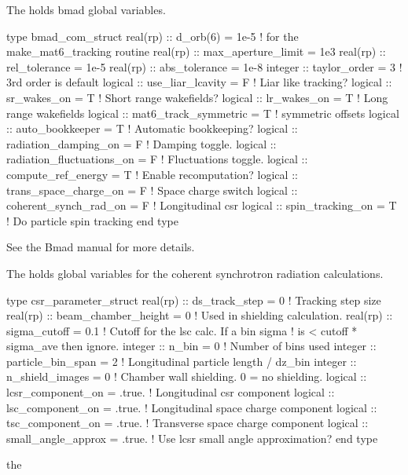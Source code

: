 {{{{{{The  holds bmad global variables. 
\begin{example}
  type bmad_com_struct
    real(rp) :: d_orb(6) = 1e-5  ! for the make_mat6_tracking routine
    real(rp) :: max_aperture_limit = 1e3    
    real(rp) :: rel_tolerance = 1e-5
    real(rp) :: abs_tolerance = 1e-8
    integer :: taylor_order = 3               ! 3rd order is default
    logical :: use_liar_lcavity = F           ! Liar like tracking?
    logical :: sr_wakes_on = T                ! Short range wakefields?
    logical :: lr_wakes_on = T                ! Long range wakefields
    logical :: mat6_track_symmetric = T       ! symmetric offsets
    logical :: auto_bookkeeper = T            ! Automatic bookkeeping?
    logical :: radiation_damping_on = F       ! Damping toggle.
    logical :: radiation_fluctuations_on = F  ! Fluctuations toggle.
    logical :: compute_ref_energy = T         ! Enable recomputation?
    logical :: trans_space_charge_on = F      ! Space charge switch
    logical :: coherent_synch_rad_on = F      ! Longitudinal csr 
    logical :: spin_tracking_on = T           ! Do particle spin tracking
  end type
\end{example}
See the Bmad manual for more details.

The  holds global variables for the coherent
synchrotron radiation calculations. 
\begin{example}
  type csr_parameter_struct
    real(rp) :: ds_track_step = 0          ! Tracking step size
    real(rp) :: beam_chamber_height = 0    ! Used in shielding calculation.
    real(rp) :: sigma_cutoff = 0.1         ! Cutoff for the lsc calc. If a bin sigma
                                           !  is < cutoff * sigma_ave then ignore.
    integer :: n_bin = 0                   ! Number of bins used
    integer :: particle_bin_span = 2       ! Longitudinal particle length / dz_bin
    integer :: n_shield_images = 0         ! Chamber wall shielding. 0 = no shielding.
    logical :: lcsr_component_on = .true.  ! Longitudinal csr component
    logical :: lsc_component_on = .true.   ! Longitudinal space charge component
    logical :: tsc_component_on = .true.   ! Transverse space charge component
    logical :: small_angle_approx = .true. ! Use lcsr small angle approximation?
  end type
\end{example}
the \vn{global%
See the Bmad manual for more details.

}}}}}}}
